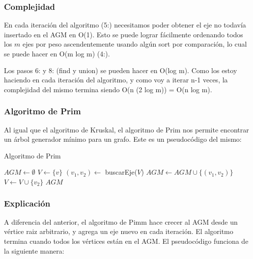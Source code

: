 \subsubsection*{Complejidad}

En cada iteraci\'on del algoritmo (5:) necesitamos poder obtener el eje no todav\'ia insertado en el AGM en O(1). Esto se puede lograr f\'acilmente ordenando todos los $m$ ejes por peso ascendentemente usando alg\'un sort por comparaci\'on, lo cual se puede hacer en O(m log m) (4:).

Los pasos 6: y 8: (find y union) se pueden hacer en O(log m). Como los estoy haciendo en cada iteraci\'on del algoritmo, y como voy a iterar n-1 veces, la complejidad del mismo termina siendo O(n (2 log m)) = O(n log m).

\newpage
\subsubsection{Algoritmo de Prim}

Al igual que el algoritmo de Kruskal, el algoritmo de Prim nos permite encontrar un \'arbol generador m\'inimo para un grafo. Este es un pseudoc\'odigo del mismo:

\begin{algorithm}
\caption{Algoritmo de Prim}
\begin{algorithmic}[1]
\State $AGM \gets \emptyset$
\State $V \gets \{ v \}$
  \State $(v_1, v_2) \gets$ buscarEje($V$)
  \State $AGM \gets AGM \cup \{ (v_1, v_2) \}$
  \State $V \gets V \cup \{ v_2 \}$
\EndWhile
\Return $AGM$
\end{algorithmic}
\end{algorithm}

\subsubsection*{Explicaci\'on}

A diferencia del anterior, el algoritmo de Pimm hace crecer al AGM desde un v\'ertice raiz arbitrario, y agrega un eje nuevo en cada iteraci\'on. El algoritmo termina cuando todos los v\'ertices est\'an en el AGM. El pseudoc\'odigo funciona de la siguiente manera:

